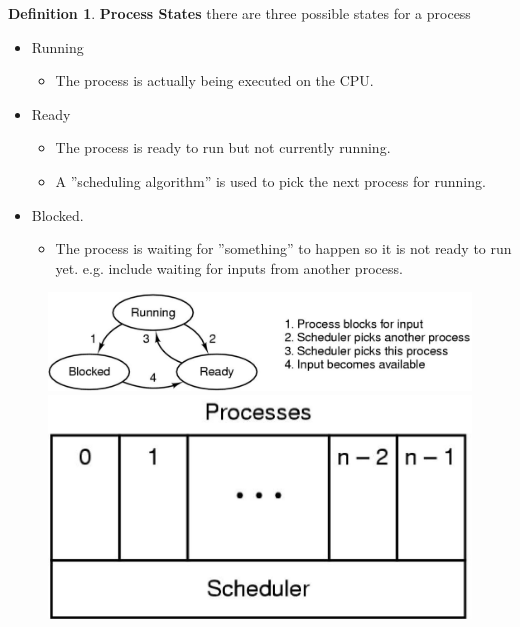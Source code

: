 \documentclass[11pt,a4paper]{article}
\theoremstyle{definition}
\newtheorem{definition}{Definition}[section]
\newenvironment{myitemize}
{ \begin{itemize}
    \setlength{\itemsep}{5pt}
    \setlength{\parskip}{0pt}
    \setlength{\parsep}{0pt}     }
{ \end{itemize}                  }
\begin{document}
\begin{definition}{\textbf{Process States}} there are three possible states for a process
	\begin{myitemize}
		\item Running 
		\begin{myitemize}
			\item The process is actually being executed on the CPU.
		\end{myitemize}
		\item Ready 
		\begin{myitemize}
			\item The process is ready to run but not currently running. 
			\item A ''scheduling algorithm'' is used to pick the next process for running.
		\end{myitemize}
		\item Blocked.
		\begin{myitemize}
			\item The process is waiting for ''something'' to happen so it is not ready to run yet. e.g. include waiting for inputs from another process.
		\end{myitemize}
	\end{myitemize}
\end{definition}

\begin{figure}[h!]
	\includegraphics[scale=0.3]{m1/processStates}
	\includegraphics[scale=0.3]{m1/processStates2}
	\centering
\end{figure}
\end{document}
